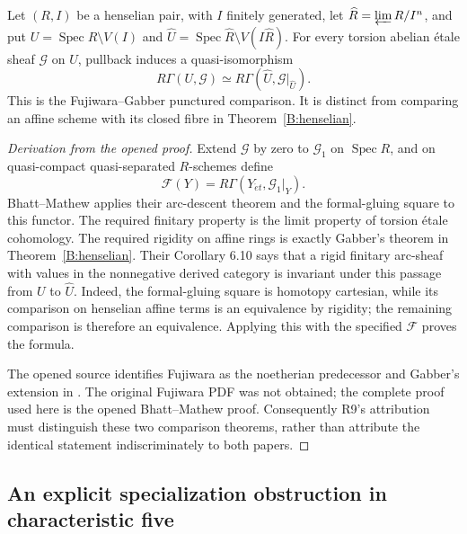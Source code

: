 \begin{theorem}\label{B:Fujiwara}
Let $(R,I)$ be a henselian pair, with $I$ finitely generated, let $\widehat R=\varprojlim R/I^n$, and put $U=\operatorname{Spec}R\setminus V(I)$ and $\widehat U=\operatorname{Spec}\widehat R\setminus V(I\widehat R)$. For every torsion abelian \'etale sheaf $\mathcal G$ on $U$, pullback induces a quasi-isomorphism
\[
 R\Gamma(U,\mathcal G)\simeq R\Gamma(\widehat U,\mathcal G|_{\widehat U}).
\]
This is the Fujiwara--Gabber punctured comparison. It is distinct from comparing an affine scheme with its closed fibre in Theorem~\ref{B:henselian}.
\end{theorem}
\begin{proof}[Derivation from the opened proof]
Extend $\mathcal G$ by zero to $\mathcal G_1$ on $\operatorname{Spec}R$, and on quasi-compact quasi-separated $R$-schemes define
\[
 \mathcal F(Y)=R\Gamma(Y_{\acute et},\mathcal G_1|_Y).
\]
Bhatt--Mathew \cite[Theorem 6.11 and its proof]{BBhattMathew2021} applies their arc-descent theorem and the formal-gluing square to this functor. The required finitary property is the limit property of torsion \'etale cohomology. The required rigidity on affine rings is exactly Gabber's theorem in Theorem~\ref{B:henselian}. Their Corollary 6.10 says that a rigid finitary arc-sheaf with values in the nonnegative derived category is invariant under this passage from $U$ to $\widehat U$. Indeed, the formal-gluing square is homotopy cartesian, while its comparison on henselian affine terms is an equivalence by rigidity; the remaining comparison is therefore an equivalence. Applying this with the specified $\mathcal F$ proves the formula.

The opened source identifies Fujiwara \cite[Corollary 6.6.4]{BFujiwara1995} as the noetherian predecessor and Gabber's extension in \cite[Expos\'e XX, \S4.4]{BILO2014}. The original Fujiwara PDF was not obtained; the complete proof used here is the opened Bhatt--Mathew proof. Consequently R9's attribution must distinguish these two comparison theorems, rather than attribute the identical statement indiscriminately to both papers.
\end{proof}

\subsection{An explicit specialization obstruction in characteristic five}

